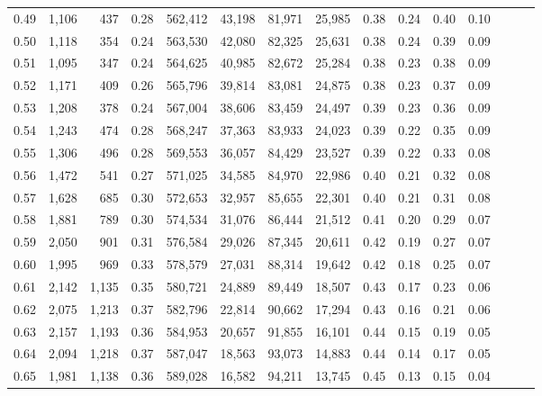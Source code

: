 \begin{tabular}{rrrrrrrrrrrrrrr}
0.49 &   1,106 &    437 &  0.28 &  562,412 &   43,198 &   81,971 &   25,985 &  0.38 &  0.24 &  0.40 &      0.10 \\
0.50 &   1,118 &    354 &  0.24 &  563,530 &   42,080 &   82,325 &   25,631 &  0.38 &  0.24 &  0.39 &      0.09 \\
0.51 &   1,095 &    347 &  0.24 &  564,625 &   40,985 &   82,672 &   25,284 &  0.38 &  0.23 &  0.38 &      0.09 \\
0.52 &   1,171 &    409 &  0.26 &  565,796 &   39,814 &   83,081 &   24,875 &  0.38 &  0.23 &  0.37 &      0.09 \\
0.53 &   1,208 &    378 &  0.24 &  567,004 &   38,606 &   83,459 &   24,497 &  0.39 &  0.23 &  0.36 &      0.09 \\
0.54 &   1,243 &    474 &  0.28 &  568,247 &   37,363 &   83,933 &   24,023 &  0.39 &  0.22 &  0.35 &      0.09 \\
0.55 &   1,306 &    496 &  0.28 &  569,553 &   36,057 &   84,429 &   23,527 &  0.39 &  0.22 &  0.33 &      0.08 \\
0.56 &   1,472 &    541 &  0.27 &  571,025 &   34,585 &   84,970 &   22,986 &  0.40 &  0.21 &  0.32 &      0.08 \\
0.57 &   1,628 &    685 &  0.30 &  572,653 &   32,957 &   85,655 &   22,301 &  0.40 &  0.21 &  0.31 &      0.08 \\
0.58 &   1,881 &    789 &  0.30 &  574,534 &   31,076 &   86,444 &   21,512 &  0.41 &  0.20 &  0.29 &      0.07 \\
0.59 &   2,050 &    901 &  0.31 &  576,584 &   29,026 &   87,345 &   20,611 &  0.42 &  0.19 &  0.27 &      0.07 \\
0.60 &   1,995 &    969 &  0.33 &  578,579 &   27,031 &   88,314 &   19,642 &  0.42 &  0.18 &  0.25 &      0.07 \\
0.61 &   2,142 &  1,135 &  0.35 &  580,721 &   24,889 &   89,449 &   18,507 &  0.43 &  0.17 &  0.23 &      0.06 \\
0.62 &   2,075 &  1,213 &  0.37 &  582,796 &   22,814 &   90,662 &   17,294 &  0.43 &  0.16 &  0.21 &      0.06 \\
0.63 &   2,157 &  1,193 &  0.36 &  584,953 &   20,657 &   91,855 &   16,101 &  0.44 &  0.15 &  0.19 &      0.05 \\
0.64 &   2,094 &  1,218 &  0.37 &  587,047 &   18,563 &   93,073 &   14,883 &  0.44 &  0.14 &  0.17 &      0.05 \\
0.65 &   1,981 &  1,138 &  0.36 &  589,028 &   16,582 &   94,211 &   13,745 &  0.45 &  0.13 &  0.15 &      0.04 \\

\end{tabular}
